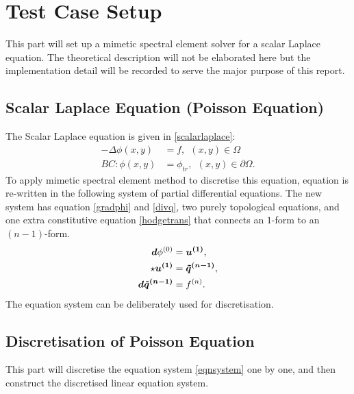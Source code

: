 \section{Test Case Setup}\label{intro}
This part will set up a mimetic spectral element solver for a scalar Laplace equation. The theoretical description will not be elaborated here but the implementation detail will be recorded to serve the major purpose of this report. \\

\subsection{Scalar Laplace Equation (Poisson Equation)}
The Scalar Laplace equation is given in \ref{scalarlaplace}:
\begin{subequations}\label{scalarlaplace} 
	\begin{align}
		-\Delta \phi(x,y) &= f, \ \ (x,y) \in \Omega \\
		BC: \phi(x,y) &= \phi_{tr}, \ \ (x,y) \in \partial \Omega.
	\end{align}

\end{subequations}
To apply mimetic spectral element method to discretise this equation, equation is re-written in the following system of partial differential equations. The new system has equation \ref{gradphi} and \ref{divq}, two purely topological equations, and one extra constitutive equation \ref{hodgetrans} that connects an $1$-form to an $(n-1)$-form. 
\begin{subequations}\label{eqnsystem}
	\begin{align} \label{gradphi}
		\boldsymbol{d}\phi^{(0)} &= \boldsymbol{u^{(1)}}, \\ \label{hodgetrans}
		\star \boldsymbol{u^{(1)}} &= \boldsymbol{\tilde{q}^{(n-1)}}, \\ \label{divq}
		\boldsymbol{d}\boldsymbol{\tilde{q}^{(n-1)}} &= f^{(n)}.
	\end{align}
\end{subequations}
The equation system can be deliberately used for discretisation. \\

\subsection{Discretisation of Poisson Equation}
This part will discretise the equation system \ref{eqnsystem} one by one, and then construct the discretised linear equation system.\\

